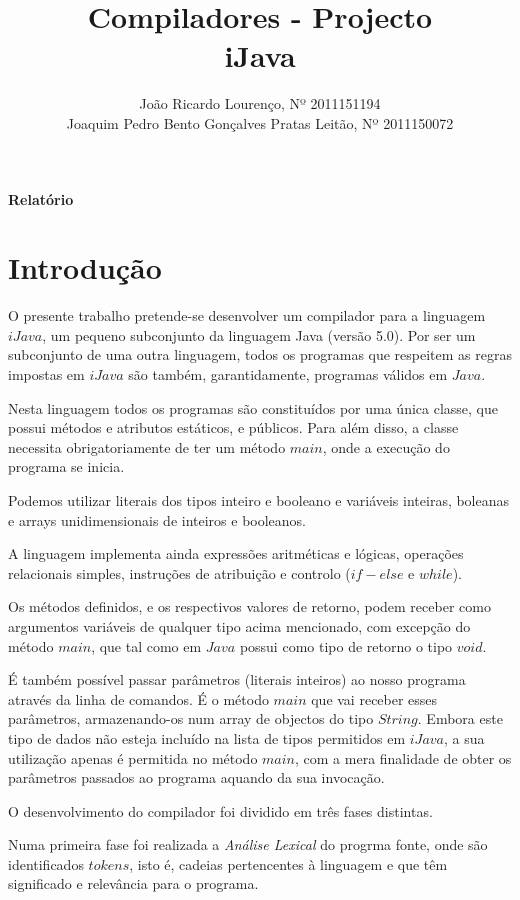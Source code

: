 \documentclass[11pt,a4paper]{article}
\title{\bf{Compiladores - Projecto}\vspace{50mm}\\iJava\vspace{80mm}}
\author{
João Ricardo Lourenço, Nº 2011151194\\
Joaquim Pedro Bento Gonçalves Pratas Leitão, Nº 2011150072}
\begin{document}
\maketitle
\centerline{\textbf{Relatório}}
\pagebreak

\printindex

\renewcommand*\contentsname{Índice}
\tableofcontents

\pagebreak

\section{Introdução}

O presente trabalho pretende-se desenvolver um compilador para a linguagem $iJava$, um pequeno subconjunto da linguagem Java (versão 5.0). Por ser um subconjunto de uma outra linguagem, todos os programas que respeitem as regras impostas em $iJava$ são também, garantidamente, programas válidos em $Java$.

Nesta linguagem todos os programas são constituídos por uma única classe, que possui métodos e atributos estáticos, e públicos. Para além disso, a classe necessita obrigatoriamente de ter um método $main$, onde a execução do programa se inicia. 

Podemos utilizar literais dos tipos inteiro e booleano e variáveis inteiras, boleanas e arrays unidimensionais de inteiros e booleanos.

A linguagem implementa ainda expressões aritméticas e lógicas, operações relacionais simples, instruções de atribuição e controlo ($if-else$ e $while$).

Os métodos definidos, e os respectivos valores de retorno, podem receber como argumentos variáveis de qualquer tipo acima mencionado, com excepção do método $main$, que tal como em $Java$ possui como tipo de retorno o tipo $void$.

É também possível passar parâmetros (literais inteiros) ao nosso programa através da linha de comandos. É o método $main$ que vai receber esses parâmetros, armazenando-os num array de objectos do tipo $String$. Embora este tipo de dados não esteja incluído na lista de tipos permitidos em $iJava$, a sua utilização apenas é permitida no método $main$, com a mera finalidade de obter os parâmetros passados ao programa aquando da sua invocação.

O desenvolvimento do compilador foi dividido em três fases distintas.

Numa primeira fase foi realizada a \emph{Análise Lexical} do progrma fonte, onde são identificados $tokens$, isto é, cadeias pertencentes à linguagem e que têm significado e relevância para o programa.
\end{document}
